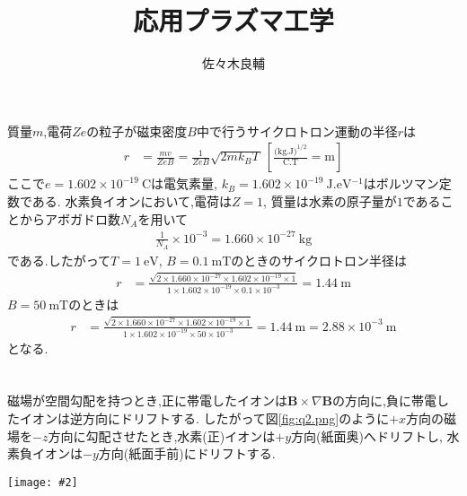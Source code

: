 \documentclass[uplatex,a4j,11pt,dvipdfmx]{jsarticle}
\makeatletter
\def\fgcaption{\def\@captype{figure}\caption}
\newcommand{\mfig}[3][width=15cm]{
\begin{center}
\texttt{[image: \#2]}
\fgcaption{#3 \label{fig:#2}}
\end{center}
}
\makeatother
\begin{document}
\title{応用プラズマ工学}
\author{佐々木良輔}
\date{}
\maketitle
\section{}
質量$m$,電荷$Ze$の粒子が磁束密度$B$中で行うサイクロトロン運動の半径$r$は
\begin{align}
  r&=\frac{mv}{ZeB}=\frac{1}{ZeB}\sqrt{2mk_BT}\ \left[\frac{\si{(\kilo\gram.\joule)^{1/2}}}{\si{\coulomb.\tesla}}=\si{\metre}\right]
\end{align}
ここで$e=1.602\times10^{-19}\ \si{\coulomb}$は電気素量, $k_B=1.602\times10^{-19}\ \si{\joule.\electronvolt^{-1}}$はボルツマン定数である.
水素負イオンにおいて,電荷は$Z=1$, 質量は水素の原子量が$1$であることからアボガドロ数$N_A$を用いて
\begin{align}
  \frac{1}{N_A}\times10^{-3}=1.660\times10^{-27}\ \si{\kilo\gram}
\end{align}
である.したがって$T=1\ \si{\electronvolt}$, $B=0.1\ \si{\milli\tesla}$のときのサイクロトロン半径は
\begin{align}
    r&=\frac{\sqrt{2\times1.660\times10^{-27}\times1.602\times10^{-19}\times1}}{1\times1.602\times10^{-19}\times0.1\times10^{-3}}=1.44\ \si{\metre}
\end{align}
$B=50\ \si{\milli\tesla}$のときは
\begin{align}
  r&=\frac{\sqrt{2\times1.660\times10^{-27}\times1.602\times10^{-19}\times1}}{1\times1.602\times10^{-19}\times50\times10^{-3}}=1.44\ \si{\metre}=2.88\times10^{-3}\ \si{\metre}
\end{align}
となる.
\newpage
\section{}
磁場が空間勾配を持つとき,正に帯電したイオンは${\bm B}\times\nabla {\bm B}$の方向に,負に帯電したイオンは逆方向にドリフトする.
したがって図\ref{fig:q2.png}のように$+x$方向の磁場を$-z$方向に勾配させたとき,水素(正)イオンは$+y$方向(紙面奥)へドリフトし,
水素負イオンは$-y$方向(紙面手前)にドリフトする.
\mfig[width=4cm]{q2.png}{磁場とその空間勾配}
\end{document}
